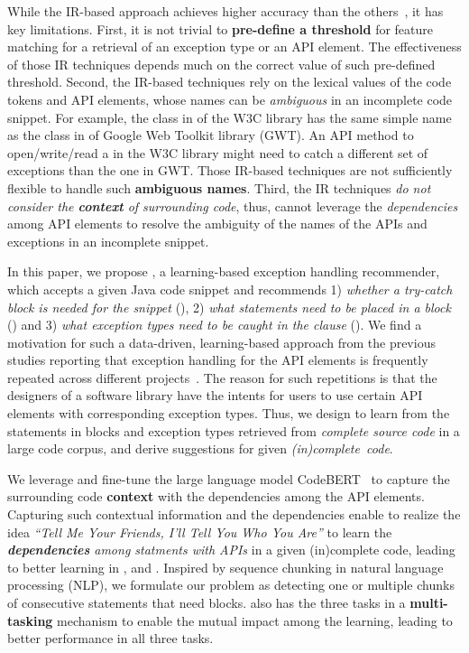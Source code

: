 While the IR-based approach achieves higher accuracy than the
others~\cite{xrank-fse20}, it has key limitations. First, it is not
trivial to {\bf pre-define a threshold} for feature matching for a
retrieval of an exception type or an API element. The effectiveness of
those IR techniques depends much on the correct value of such
pre-defined threshold. Second, the IR-based techniques rely on the
lexical values of the code tokens and API elements, whose names can be
{\em ambiguous} in an incomplete code snippet. For example, the
 class in  of the W3C library has
the same simple name as the  class in
 of Google Web
Toolkit library (GWT). An API method to open/write/read a
 in the W3C library might need to catch a different set
of exceptions than the one in GWT. Those IR-based techniques are not
sufficiently flexible to handle such {\bf ambiguous names}. Third, the
IR techniques {\em do not consider the {\bf context} of surrounding
  code}, thus, cannot leverage the {\em dependencies} among API
elements to resolve the ambiguity of the names of the APIs and
  exceptions in an incomplete snippet.

In this paper, we propose {\tool}, a learning-based exception handling
recommender, which accepts a given Java code snippet and recommends 1)
{\em whether a try-catch block is needed for the snippet} ({\xblock}),
2) {\em what statements need to be placed in a  block}
({\xstate}) and 3) {\em what exception types need to be caught in the
   clause} ({\xtype}).  We find a motivation for such a
data-driven, learning-based approach from the previous studies
reporting that exception handling for the API elements is frequently
repeated across different
projects~\cite{chanchal-scam14,zhong-jss18}. The reason for such
repetitions is that the designers of a software library have the
intents for users to use certain API elements with corresponding
exception types. Thus, we design {\tool} to learn from the statements
in  blocks and exception types retrieved from {\em
  complete source code} in a large code corpus, and derive suggestions
for given {\em (in)complete~code}.

We leverage and fine-tune the large language model
CodeBERT~\cite{codebert-emnlp20} to capture the surrounding code {\bf context}
with the dependencies among the API elements. Capturing such
contextual information and the dependencies enable {\tool} to realize
the idea {\em ``Tell Me Your Friends, I'll Tell You Who You Are''} to
learn the {\em {\bf dependencies} among statments with APIs} in a given
(in)complete code, leading to better learning in {\xblock}, {\xstate}
and {\xtype}. Inspired by sequence chunking in natural language
processing (NLP), we formulate our problem as detecting one or
multiple chunks of consecutive statements that need 
blocks.
{\tool} also has the three tasks in a {\bf multi-tasking} mechanism
to enable the mutual impact among the learning, leading to
better performance in all three tasks.

